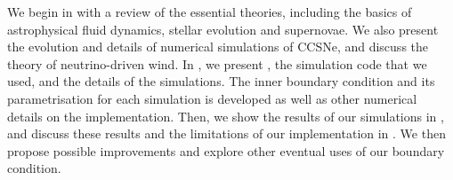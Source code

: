 We begin in  with a review of the essential theories, including the basics of astrophysical fluid dynamics, stellar evolution and supernovae. We also present the evolution and details of numerical simulations of CCSNe, and discuss the theory of neutrino-driven wind. In , we present \flash, the simulation code that we used, and the details of the simulations. The inner boundary condition and its parametrisation for each simulation is developed as well as other numerical details on the implementation. Then, we show the results of our simulations in , and discuss these results and the limitations of our implementation in . We then propose possible improvements and explore other eventual uses of our boundary condition.
